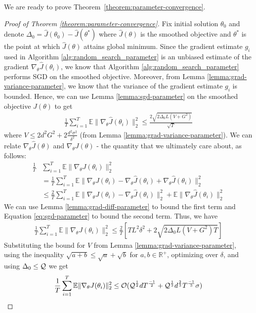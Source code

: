 We are ready to prove Theorem~\ref{theorem:parameter-convergence}.
\begin{proof}[Proof of Theorem \ref{theorem:parameter-convergence}]
  Fix initial solution $\theta_0$ and denote $\Delta_0 =
  \hat{J}(\theta_0) - \hat{J}(\theta^*)$ where $\hat{J}(\theta)$ is
  the smoothed objective and $\theta^*$ is the point at which
  $\hat{J}(\theta)$  attains global minimum.
  Since the gradient estimate $g_i$ used in Algorithm
  \ref{alg:random_search_parameter} is an unbiased estimate of the
  gradient $\nabla_\theta \hat{J}(\theta_i)$, we know that Algorithm
  \ref{alg:random_search_parameter} performs SGD on the smoothed
  objective. Moreover, from Lemma \ref{lemma:grad-variance-parameter},
  we know that the variance of the gradient estimate $g_i$ is
  bounded. Hence, we can use Lemma \ref{lemma:sgd-parameter} on the
  smoothed objective $\hat{J}(\theta)$ to get
  \begin{align}
    \label{eq:sgd-parameter}
    \frac{1}{T} \sum_{i=1}^T \mathbb{E}\|\nabla_\theta
    \hat{J}(\theta_i)\|_2^2 \leq \frac{2\sqrt{2\Delta_0L(V+G^2)}}{\sqrt{T}}
  \end{align}
  where $V \leq 2d^2G^2 + 2\frac{d^2\sigma^2}{\delta^2}$ (from Lemma
  \ref{lemma:grad-variance-parameter}). We can relate $\nabla_\theta
  \hat{J}(\theta)$ and $\nabla_\theta J(\theta)$ - the quantity that
  we ultimately care about, as follows:
  \begin{align*}
    \frac{1}{T} &\sum_{i=1}^T \mathbb{E}\|\nabla_\theta
    J(\theta_i)\|_2^2\\
    &= \frac{1}{T} \sum_{i=1}^T
                        \mathbb{E}\|\nabla_\theta J(\theta_i) -
                        \nabla_\theta \hat{J}(\theta_i) +
      \nabla_\theta \hat{J}(\theta_i)\|_2^2 \\
    &\leq \frac{2}{T} \sum_{i=1}^T \mathbb{E}\|\nabla_\theta J(\theta_i) -
                        \nabla_\theta \hat{J}(\theta_i)\|_2^2 + \mathbb{E}\|\nabla_\theta \hat{J}(\theta_i)\|_2^2
  \end{align*}
  We can use Lemma \ref{lemma:grad-diff-parameter} to bound the first
  term and Equation \ref{eq:sgd-parameter} to bound the second
  term. Thus, we have
  \begin{align*}
    \frac{1}{T} \sum_{i=1}^T \mathbb{E}\|\nabla_\theta
    J(\theta_i)\|_2^2 \leq \frac{2}{T}[TL^2\delta^2 + 2\sqrt{2\Delta_0L(V+G^2)T}]
  \end{align*}
  Substituting the bound for $V$ from Lemma
  \ref{lemma:grad-variance-parameter}, using the inequality
  $\sqrt{a+b} \leq \sqrt{a} + \sqrt{b}$ for $a, b \in \mathbb{R}^+$,
  optimizing over $\delta$, and using $\Delta_0 \leq \mathcal{Q}$ we get
  \begin{equation*}
    \frac{1}{T} \sum_{i=1}^T \mathbb{E}\|\nabla_\theta
    J(\theta_i)\|_2^2 \leq \mathcal{O}(\mathcal{Q}^{\frac{1}{2}}dT^{\frac{-1}{2}} + \mathcal{Q}^{\frac{1}{3}}d^{\frac{2}{3}}T^{\frac{-1}{3}}\sigma)
  \end{equation*}
\end{proof}

